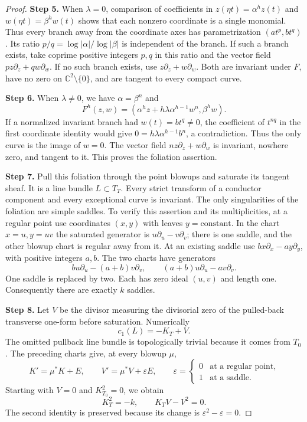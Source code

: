 \begin{proof}
\noindent\textbf{Step 5.} When $\lambda=0$, comparison of coefficients in
$z(\eta t)=\alpha^h z(t)$ and
$w(\eta t)=\beta^h w(t)$ shows that each
nonzero coordinate is a single monomial.
Thus every branch away from the coordinate axes
has parametrization $(a t^p,b t^q)$. Its ratio
$p/q=\log|\alpha|/\log|\beta|$ is independent
of the branch. If such a branch exists, take
coprime positive integers $p,q$ in this ratio
and the vector field
$p z\partial_z+q w\partial_w$.
If no such branch exists, use
$z\partial_z+w\partial_w$.
Both are invariant under $F$, have no zero on
$\mathbb C^2\setminus\{0\}$, and are tangent
to every compact curve.

\noindent\textbf{Step 6.} When $\lambda\ne0$, we have $\alpha=\beta^n$ and
\[
 F^h(z,w)=
 (\alpha^h z+h\lambda\alpha^{h-1}w^n,\beta^h w).
\]
If a normalized invariant branch had
$w(t)=b t^q\ne0$, the coefficient of $t^{nq}$
in the first coordinate identity would give
$0=h\lambda\alpha^{h-1}b^n$, a contradiction.
Thus the only curve is the image of $w=0$.
The vector field $n z\partial_z+w\partial_w$
is invariant, nowhere zero, and tangent to it.
This proves the foliation assertion.

\noindent\textbf{Step 7.} Pull this foliation through the point blowups
and saturate its tangent sheaf. It is a line
bundle $L\subset T_T$. Every strict transform
of a conductor component and every exceptional
curve is invariant. The only singularities of
the foliation are simple saddles. To verify
this assertion and its multiplicities, at a
regular point use coordinates $(x,y)$ with
leaves $y=\text{constant}$. In the chart
$x=u,y=uv$ the saturated generator is
$u\partial_u-v\partial_v$; there is one
saddle, and the other blowup chart is regular
away from it. At an existing saddle use
$b x\partial_x-a y\partial_y$, with positive
integers $a,b$. The two charts have generators
\[
 b u\partial_u-(a+b)v\partial_v,\qquad
 (a+b)u\partial_u-a v\partial_v.
\]
One saddle is replaced by two. Each has
zero ideal $(u,v)$ and length one.
Consequently there are exactly $k$ saddles.

\noindent\textbf{Step 8.} Let $V$ be the divisor measuring the
divisorial zero of the pulled-back transverse
one-form before saturation. Numerically
\[
 c_1(L)=-K_T+V.
\]
The omitted pullback line bundle is topologically
trivial because it comes from $T_0$.
The preceding charts give, at every blowup $\mu$,
\[
 K'=\mu^*K+E,\qquad
 V'=\mu^*V+\varepsilon E,\qquad
 \varepsilon=
 \begin{cases}0&\text{at a regular point},\\
 1&\text{at a saddle}.
 \end{cases}
\]
Starting with $V=0$ and $K_{T_0}^2=0$, we obtain
\[
 K_T^2=-k,\qquad K_TV-V^2=0.
\]
The second identity is preserved because its
change is $\varepsilon^2-\varepsilon=0$.


\end{proof}

